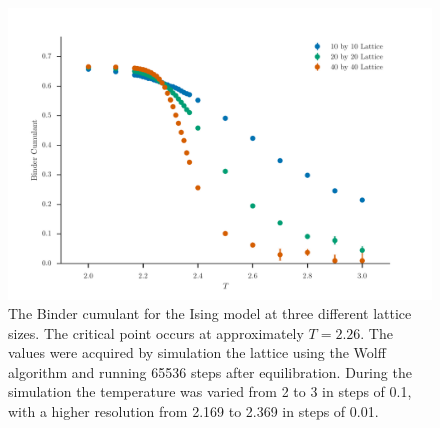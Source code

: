 \documentclass[11pt, a4paper]{report} %
\begin{document}
\begin{figure}[htb]
	\includegraphics[width=\linewidth]{wolff_binder_cumulant.pdf}
	\caption{The Binder cumulant for the Ising model at three different lattice sizes. The critical point occurs at approximately \(T = 2.26\). The values were acquired by simulation the lattice using the Wolff algorithm and running 65536 steps after equilibration. During the simulation the temperature was varied from 2 to 3 in steps of 0.1, with a higher resolution from 2.169 to 2.369 in steps of 0.01.}
	\label{fig:ising_binder_cumulant}
\end{figure}
\end{document}
